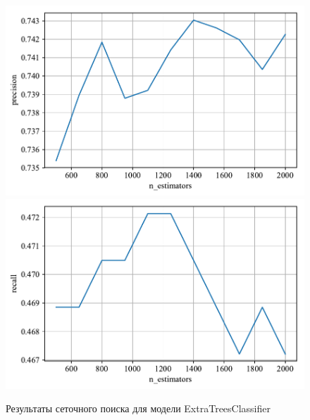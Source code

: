 \begin{figure}
    \centering
    \includegraphics{../images/toloka_extratrees_precision.pdf}
    \includegraphics{../images/toloka_extratrees_recall.pdf}
    \caption{Результаты сеточного поиска для модели ExtraTreesClassifier}
    \label{fig:toloka_extratrees}
\end{figure}

